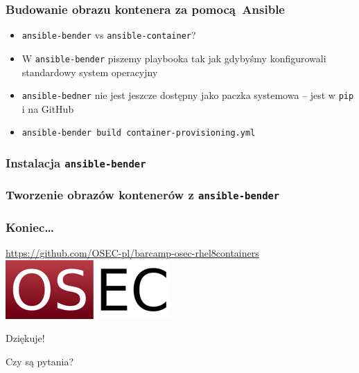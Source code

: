 \documentclass[dvipsnames,table]{beamer}
\begin{document}
\begin{frame}[fragile]
	\frametitle{Budowanie obrazu kontenera za pomocą Ansible}
%	
\begin{itemize}
	\item {\tt ansible-bender} vs {\tt ansible-container}?
	\item W {\tt ansible-bender} piszemy playbooka tak jak gdybyśmy konfigurowali standardowy system operacyjny
	\item {\tt ansible-bedner} nie jest jeszcze dostępny jako paczka systemowa -- jest w {\tt pip} i na GitHub
	\item {\tt ansible-bender build container-provisioning.yml}
\end{itemize}
\end{frame}





%

\begin{frame}[fragile]
	\frametitle{Instalacja {\tt ansible-bender}}
	
\end{frame}

\begin{frame}[fragile]
	\frametitle{Tworzenie obrazów kontenerów z {\tt ansible-bender}}
	
\end{frame}

\begin{frame}
\frametitle{Koniec\ldots}
\begin{center}
\href{https://github.com/OSEC-pl/barcamp-osec-rhel8containers}{https://github.com/OSEC-pl/barcamp-osec-rhel8containers}
\includegraphics[scale=0.5]{img-oseclogo.png}

Dziękuje!

Czy są pytania?

\end{center}
\end{frame}
\end{document}
